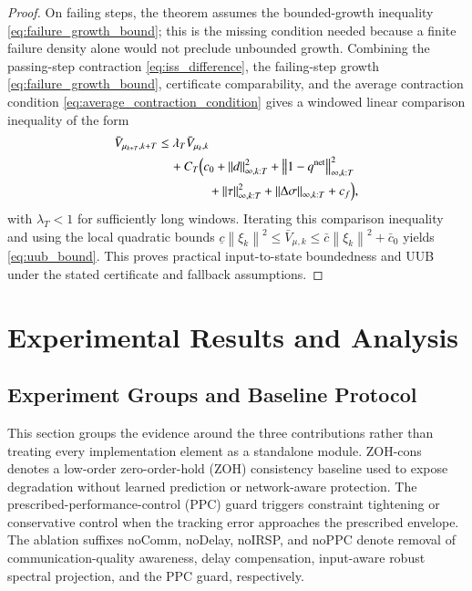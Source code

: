 \documentclass[twocolumn,3p,times,procedia]{elsarticle}
\newcommand{\ZOHcons}{ZOH-cons}
\newcommand{\norm}[1]{\left\lVert #1 \right\rVert}
\begin{document}
\begin{proof}
On failing steps, the theorem assumes the bounded-growth inequality \eqref{eq:failure_growth_bound}; this is the missing condition needed because a finite failure density alone would not preclude unbounded growth. Combining the passing-step contraction \eqref{eq:iss_difference}, the failing-step growth \eqref{eq:failure_growth_bound}, certificate comparability, and the average contraction condition \eqref{eq:average_contraction_condition} gives a windowed linear comparison inequality of the form
\begin{equation}
\begin{aligned}
\bar V_{\mu_{k+T},k+T}
&\le \lambda_T\bar V_{\mu_k,k}\\
&\quad +C_T\Bigl(c_0+\norm{d}_{\infty,k:T}^2
+\norm{1-q^{\mathrm{net}}}_{\infty,k:T}^2\\
&\qquad\qquad
+\norm{\tau}_{\infty,k:T}^2
+\norm{\Delta\sigma}_{\infty,k:T}+c_f\Bigr),
\end{aligned}
\label{eq:window_comparison}
\end{equation}
with $\lambda_T<1$ for sufficiently long windows. Iterating this comparison inequality and using the local quadratic bounds
$\underline c\norm{\xi_k}^2\le\bar V_{\mu,k}\le\bar c\norm{\xi_k}^2+\bar c_0$ yields \eqref{eq:uub_bound}. This proves practical input-to-state boundedness and UUB under the stated certificate and fallback assumptions.
\end{proof}


\section{Experimental Results and Analysis}

\subsection{Experiment Groups and Baseline Protocol}

This section groups the evidence around the three contributions rather than treating every implementation element as a standalone module. \ZOHcons{} denotes a low-order zero-order-hold (ZOH) consistency baseline used to expose degradation without learned prediction or network-aware protection. The prescribed-performance-control (PPC) guard triggers constraint tightening or conservative control when the tracking error approaches the prescribed envelope. The ablation suffixes noComm, noDelay, noIRSP, and noPPC denote removal of communication-quality awareness, delay compensation, input-aware robust spectral projection, and the PPC guard, respectively.
\end{document}
